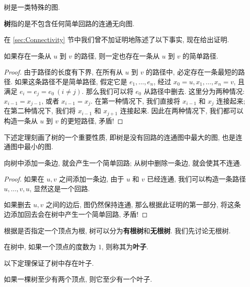 树是一类特殊的图.

\begin{definition}[树]
    \textbf{树}指的是不包含任何简单回路的连通无向图. 
\end{definition}

在 \ref{sec:Connectivity} 节中我们曾不加证明地陈述了以下事实, 现在给出证明.

\begin{lemma}
    如果存在一条从 $u$ 到 $v$ 的路径, 则一定也存在一条从 $u$ 到 $v$ 的简单路径.
\end{lemma}

\begin{proof}
    由于路径的长度有下界, 在所有从 $u$ 到 $v$ 的路径中, 必定存在一条最短的路径. 如果这条路径不是简单路径, 假定它是 $e_1,\dots,e_n$, 经过 $x_0=u,x_1,\dots,x_n=v$, 且满足 $e_i=e_j=e_0\ (i\neq j)$. 那么我们可以将 $e_0$ 从路径中删去. 这里分为两种情况: $x_{i-1}=x_{j-1}$, 或者 $x_{i-1}=x_j$. 在第一种情况下, 我们直接将 $x_{i-1}$ 和 $x_j$ 连接起来; 在第二种情况下, 我们将 $x_{i-1}$ 和 $x_{j+1}$ 连接起来. 因此在两种情况下, 我们都可以构造一条从 $u$ 到 $v$ 的更短路径, 矛盾!
\end{proof}

下述定理刻画了树的一个重要性质, 即树是没有回路的连通图中最大的图, 也是连通图中最小的图.

\begin{theorem}\label{thm:key property of trees}
    向树中添加一条边, 就会产生一个简单回路; 从树中删除一条边, 就会使其不连通.
\end{theorem}

\begin{proof}
    如果在 $u,v$ 之间添加一条边, 由于 $u$ 和 $v$ 已经连通, 我们可以构造一条路径 $u,\dots,v,u$, 显然这是一个回路.

    如果删去 $u,v$ 之间的边后, 图仍然保持连通, 那么根据此证明的第一部分, 将这条边添加回去会在树中产生一个简单回路, 矛盾!
\end{proof}

根据是否指定一个顶点为根, 树可以分为\textbf{有根树}和\textbf{无根树}. 我们先讨论无根树.

\begin{definition}[叶子]
    在树中, 如果一个顶点的度数为 $1$, 则称其为\textbf{叶子}.
\end{definition}

以下定理保证了树中存在叶子.

\begin{theorem}\label{thm:tree has at least one leaf}
    如果一棵树至少有两个顶点, 则它至少有一个叶子.
\end{theorem}

